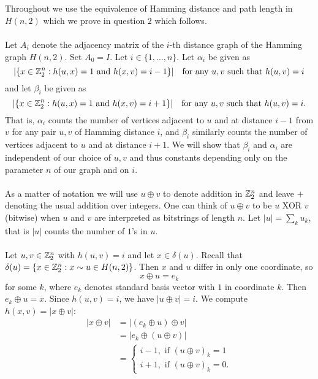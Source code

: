 \documentclass[letterpaper,12pt,oneside,onecolumn]{article}
\newcommand{\1}{\mathbbm{1}}
\begin{document}
\section{}
\paragraph{}
Throughout we use the equivalence of Hamming distance and path length in $H(n,2)$ which we prove in question $2$ which follows.
\paragraph{}
Let $A_i$ denote the adjacency matrix of the $i$-th distance graph of the Hamming graph $H(n,2)$. Set $A_0 = I$. Let $i \in \{1, \dots, n\}$. Let $\alpha_i$ be given as
$$|\{x \in \mathbb{Z}^n_2 : h(u,x) = 1 \text{ and } h(x,v) = i-1\}| \quad \text{for any }u,v\text{ such that } h(u,v) = i$$
and let $\beta_i$ be given as
$$|\{x \in \mathbb{Z}^n_2 : h(u,x) = 1 \text{ and } h(x,v) = i+1\}| \quad \text{for any }u,v\text{ such that } h(u,v) = i.$$
That is, $\alpha_i$ counts the number of vertices adjacent to $u$ and at distance $i-1$ from $v$ for any pair $u,v$ of Hamming distance $i$, and $\beta_i$ similarly counts the number of vertices adjacent to $u$ and at distance $i+1$. We will show that $\beta_i$ and $\alpha_i$ are independent of our choice of $u,v$ and thus constants depending only on the parameter $n$ of our graph and on $i$.
\paragraph{}
As a matter of notation we will use $u \oplus v$ to denote addition in $\mathbb{Z}_2^n$ and leave $+$ denoting the usual addition over integers. One can think of $u \oplus v$ to be $u$ XOR $v$ (bitwise) when $u$ and $v$ are interpreted as bitstrings of length $n$. Let $|u| = \sum_k u_k$, that is $|u|$ counts the number of $1$'s in $u$.
\paragraph{}
Let $u, v \in \mathbb{Z}^n_2$ with $h(u,v) = i$ and let $x \in \delta(u)$. Recall that $\delta(u) = \{x \in \mathbb{Z}^n_2: x\sim u \in H(n,2)\}$. Then $x$ and $u$ differ in only one coordinate, so
$$x \oplus u = e_k$$
for some $k$, where $e_k$ denotes standard basis vector with $1$ in coordinate $k$. Then $e_k \oplus u = x$. Since $h(u,v) = i$, we have $|u \oplus v | = i$. We compute $h(x,v) = |x \oplus v|$:
\begin{align*}
|x \oplus v| &= |(e_k \oplus u) \oplus v|\\
&= |e_k \oplus (u \oplus v) | \\
&= \begin{cases}
i-1, \text{ if $(u \oplus v)_k = 1$}  \\
i+1, \text{ if $(u\oplus v)_k = 0$} .
\end{cases} 
\end{align*}
\end{document}
